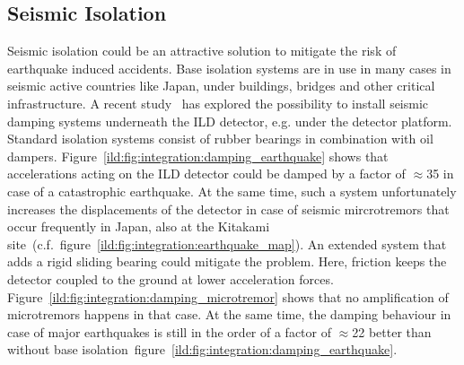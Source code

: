 \subsection{Seismic Isolation}

Seismic isolation could be an attractive solution to mitigate the risk of earthquake induced accidents. Base isolation systems are in use in many cases in seismic active countries like Japan, under buildings, bridges and other critical infrastructure. A recent study~\cite{ild:bib:Seismic_Damping} has explored the possibility to install seismic damping systems underneath the ILD detector, e.g. under the detector platform. Standard isolation systems consist of rubber bearings in combination with oil dampers. Figure~\ref{ild:fig:integration:damping_earthquake} shows that accelerations acting on the ILD detector could be damped by a factor of $\approx$35 in case of a catastrophic earthquake. At the same time, such a system unfortunately increases the displacements of the detector in case of seismic mircrotremors that occur frequently in Japan, also at the Kitakami site~(c.f.~figure~\ref{ild:fig:integration:earthquake_map}). An extended system that adds a rigid sliding bearing could mitigate the problem. Here, friction keeps the detector coupled to the ground at lower acceleration forces. Figure~\ref{ild:fig:integration:damping_microtremor} shows that no amplification of microtremors happens in that case. At the same time, the damping behaviour in case of major earthquakes is still in the order of a factor of $\approx$22 better than without base isolation~{figure~\ref{ild:fig:integration:damping_earthquake}}. 

